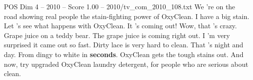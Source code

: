 \begin{textsample}{POS Dim 4 – 2010 – Score 1.00 – 2010/tv\_com\_2010\_108.txt}  \label{ex:f4_pos_059}
We 're on the road showing real people the stain-fighting power of OxyClean.
I have a big stain.
Let 's see what happens with OxyClean.
It 's coming out!
Wow, that 's crazy.
Grape juice on a teddy bear.
The grape juice is coming right out.
I 'm very surprised it came out so fast.
Dirty lace is very hard to clean.
That 's night and day.
From dingy to white in \textbf{seconds}.
OxyClean gets the tough stains out.
And now, try upgraded OxyClean laundry detergent, for people who are serious about clean.

\end{textsample}

